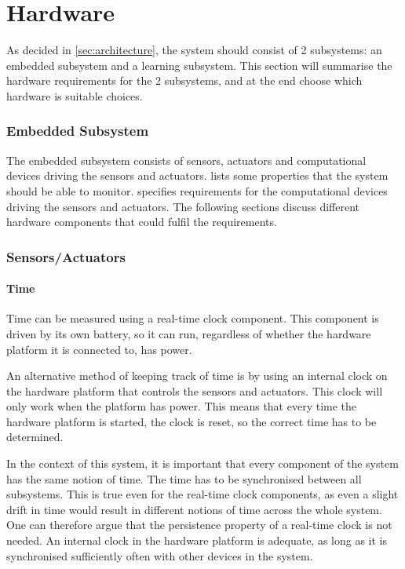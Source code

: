 \section{Hardware}
As decided in \cref{sec:architecture}, the system should consist of 2 subsystems: an embedded subsystem and a learning subsystem. This section will summarise the hardware requirements for the 2 subsystems, and at the end choose which hardware is suitable choices.



\subsubsection{Embedded Subsystem}
The embedded subsystem consists of sensors, actuators and computational devices driving the sensors and actuators.  lists some properties that the system should be able to monitor.  specifies requirements for the computational devices driving the sensors and actuators. The following sections discuss different hardware components that could fulfil the requirements.
\subsubsection{Sensors/Actuators}
\paragraph{Time}
Time can be measured using a real-time clock component. This component is driven by its own battery, so it can run, regardless of whether the hardware platform it is connected to, has power.

An alternative method of keeping track of time is by using an internal clock on the hardware platform that controls the sensors and actuators. This clock will only work when the platform has power. This means that every time the hardware platform is started, the clock is reset, so the correct time has to be determined.

In the context of this system, it is important that every component of the system has the same notion of time. The time has to be synchronised between all subsystems. This is true even for the real-time clock components, as even a slight drift in time would result in different notions of time across the whole system. One can therefore argue that the persistence property of a real-time clock is not needed. An internal clock in the hardware platform is adequate, as long as it is synchronised sufficiently often with other devices in the system.

